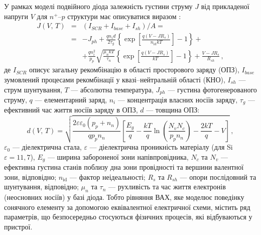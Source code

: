 У рамках моделі подвійного діода залежність густини струму $J$ від прикладеної напруги $V$ для  $n^+$--$p$ структури має описуватися  виразом \cite{2Diod:Ishaque,2Diod:Buhler}:
\begin{eqnarray}
\label{eqSSCIV}
\nonumber J(V,\,T)&=&\left(I_{SCR}+I_{base}+I_{sh}\right)/A=\\
\nonumber &=&-J_{ph}+\frac{qn_id}{2\tau_{g}}\left\{\exp \left[\frac{q(V-JR_s)}{n_\mathrm{id}kT}\right]-1\right\}+\\
&&+\frac{qn_i^2}{p_p}\sqrt{\frac{\mu_nkT}{\tau_n}}\left\{\exp \left[\frac{q(V-JR_s)}{kT}\right]-1\right\}+\frac{V-JR_s}{R_{sh}}\,,
\end{eqnarray}
де
$I_{SCR}$ описує загальну рекомбінацію в області просторового заряду (ОПЗ),
$I_{base}$ зумовлений процесами рекомбінації у квазі--нейтральній області (КНО),
$I_{sh}$ ---  струм шунтування,
$T$ --- абсолютна температура,
$J_{ph}$ --- густина фотогенерованого струму,
$q$ --- елементарний заряд,
$n_i$ --- концентрація власних носіїв заряду,
$\tau_{g}$  --- ефективний час життя носіїв заряду в ОПЗ,
$d$ --- товщина ОПЗ:
\begin{equation}
\label{eqW}
    d(V,\,T)=\sqrt{\frac{2 \varepsilon \varepsilon_0(p_p+n_n)}{q p_p n_n}\left[\frac{E_g}{q}-\frac{kT}{q}\ln\left(\frac{N_vN_c}{p_pn_n}\right)-\frac{2kT}{q}-V\right]} \,,
\end{equation}
$\varepsilon_0$ --- діелектрична стала,
$\varepsilon$ --- діелектрична проникність матеріалу (для Si $\varepsilon=11,7$),
$E_g$ --- ширина забороненої зони напівпровідника,
$N_c$ та $N_v$ --- ефективна густина станів поблизу дна зони провідності та вершини валентної зони, відповідно;
$n_\mathrm{id}$ --- фактор неідеальності;
$R_s$ та $R_{sh}$ --- опори послідовний та шунтування, відповідно;
$\mu_n$ та $\tau_n$ --- рухливість та час життя електронів (неосновних носіїв) у базі діода.
Тобто
рівняння ВАХ, яке моделює поведінку сонячного елементу за допомогою еквівалентної електричної схеми,
містить ряд параметрів, що безпосередньо стосуються фізичних процесів, які відбуваються у пристрої.

